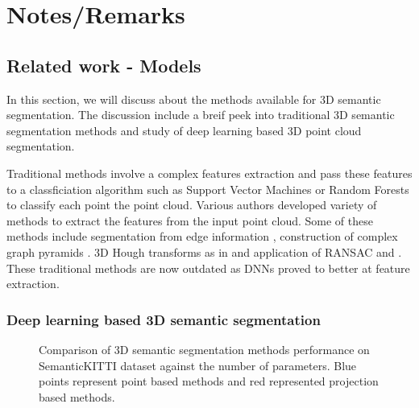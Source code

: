 

\chapter{Notes/Remarks}
\section{Related work - Models}

In this section, we will discuss about the methods available for 3D semantic segmentation.
The discussion include a breif peek into traditional 3D semantic segmentation methods and study of deep learning based 3D point cloud segmentation.

Traditional methods involve a complex features extraction and pass these features to a classficiation algorithm such as Support Vector Machines or Random Forests to classify each point the point cloud.
Various authors developed variety of methods to extract the features from the input point cloud.
Some of these methods include segmentation from edge information \cite{bhanu1986range}, construction of complex graph pyramids \cite{koster}.
3D Hough transforms as in \cite{vosselman20013d} and application of RANSAC \cite{schnabel2007efficient} and \cite{tarsha2007hough}.
These traditional methods are now outdated as DNNs proved to better at feature extraction.

\subsection{Deep learning based 3D semantic segmentation}

\begin{figure}
    \centering
    
    \caption{Comparison of 3D semantic segmentation methods performance on SemanticKITTI dataset against the number of parameters. 
             Blue points represent point based methods and red represented projection based methods.}
\end{figure}

